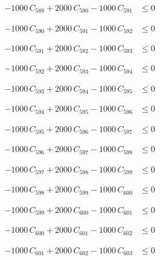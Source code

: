 \documentclass[a4paper,11pt]{article}
\begin{document}
\begin{align}
-1000\,C_{589} + 2000\,C_{590} - 1000\,C_{591} &\leq 0 \nonumber
\end{align}

\begin{align}
-1000\,C_{590} + 2000\,C_{591} - 1000\,C_{592} &\leq 0 \nonumber
\end{align}

\begin{align}
-1000\,C_{591} + 2000\,C_{592} - 1000\,C_{593} &\leq 0 \nonumber
\end{align}

\begin{align}
-1000\,C_{592} + 2000\,C_{593} - 1000\,C_{594} &\leq 0 \nonumber
\end{align}

\begin{align}
-1000\,C_{593} + 2000\,C_{594} - 1000\,C_{595} &\leq 0 \nonumber
\end{align}

\begin{align}
-1000\,C_{594} + 2000\,C_{595} - 1000\,C_{596} &\leq 0 \nonumber
\end{align}

\begin{align}
-1000\,C_{595} + 2000\,C_{596} - 1000\,C_{597} &\leq 0 \nonumber
\end{align}

\begin{align}
-1000\,C_{596} + 2000\,C_{597} - 1000\,C_{598} &\leq 0 \nonumber
\end{align}

\begin{align}
-1000\,C_{597} + 2000\,C_{598} - 1000\,C_{599} &\leq 0 \nonumber
\end{align}

\begin{align}
-1000\,C_{598} + 2000\,C_{599} - 1000\,C_{600} &\leq 0 \nonumber
\end{align}

\begin{align}
-1000\,C_{599} + 2000\,C_{600} - 1000\,C_{601} &\leq 0 \nonumber
\end{align}

\begin{align}
-1000\,C_{600} + 2000\,C_{601} - 1000\,C_{602} &\leq 0 \nonumber
\end{align}

\begin{align}
-1000\,C_{601} + 2000\,C_{602} - 1000\,C_{603} &\leq 0 \nonumber
\end{align}
\end{document}
